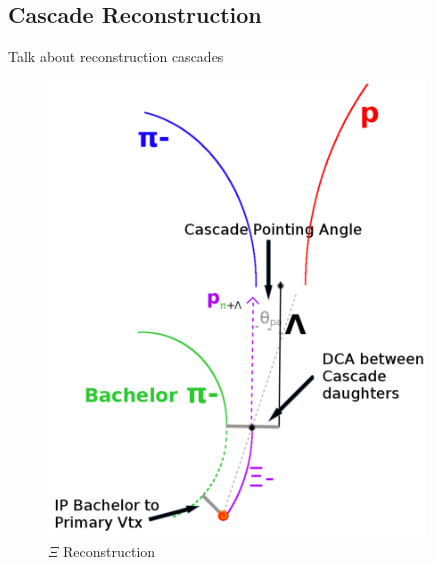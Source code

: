 \subsection{Cascade Reconstruction}
\label{CascadeReconstruction}

Talk about reconstruction cascades

\begin{figure}[h]
  \centering
  \includegraphics[width=100mm]{3_DataSelection/Figures/XiCuts.pdf}
  \caption[$\Xi$ Reconstruction]{$\Xi$ Reconstruction}
  \label{fig:XiReconstruction}
\end{figure}